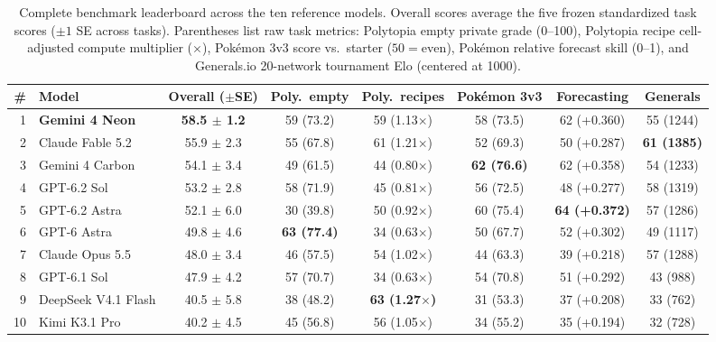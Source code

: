 \documentclass[11pt,letterpaper]{article}
\newcommand{\pokemon}{Pok\'emon}
\begin{document}
\begin{table}[htbp]
\centering
\caption{Complete benchmark leaderboard across the ten reference models. Overall scores average the five frozen standardized task scores ($\pm 1$ SE across tasks). Parentheses list raw task metrics: Polytopia empty private grade (0--100), Polytopia recipe cell-adjusted compute multiplier ($\times$), \pokemon{} 3v3 score vs.\ starter ($50 = \text{even}$), \pokemon{} relative forecast skill (0--1), and Generals.io 20-network tournament Elo (centered at 1000).}
\label{tab:leaderboard}
\footnotesize
\setlength{\tabcolsep}{3.6pt}
\begin{tabular}{@{}r l c ccccc@{}}
\toprule
\textbf{\#} & \textbf{Model} & \textbf{Overall ($\pm$SE)} & \textbf{Poly.\ empty} & \textbf{Poly.\ recipes} & \textbf{\pokemon{} 3v3} & \textbf{Forecasting} & \textbf{Generals} \\
\midrule
1  & \textbf{Gemini 4 Neon}     & \textbf{58.5 $\pm$ 1.2} & 59 (73.2) & 59 (1.13$\times$) & 58 (73.5) & 62 (+0.360) & 55 (1244) \\
2  & Claude Fable 5.2           & 55.9 $\pm$ 2.3 & 55 (67.8) & 61 (1.21$\times$) & 52 (69.3) & 50 (+0.287) & \textbf{61 (1385)} \\
3  & Gemini 4 Carbon            & 54.1 $\pm$ 3.4 & 49 (61.5) & 44 (0.80$\times$) & \textbf{62 (76.6)} & 62 (+0.358) & 54 (1233) \\
4  & GPT-6.2 Sol                & 53.2 $\pm$ 2.8 & 58 (71.9) & 45 (0.81$\times$) & 56 (72.5) & 48 (+0.277) & 58 (1319) \\
5  & GPT-6.2 Astra              & 52.1 $\pm$ 6.0 & 30 (39.8) & 50 (0.92$\times$) & 60 (75.4) & \textbf{64 (+0.372)} & 57 (1286) \\
6  & GPT-6 Astra                & 49.8 $\pm$ 4.6 & \textbf{63 (77.4)} & 34 (0.63$\times$) & 50 (67.7) & 52 (+0.302) & 49 (1117) \\
7  & Claude Opus 5.5            & 48.0 $\pm$ 3.4 & 46 (57.5) & 54 (1.02$\times$) & 44 (63.3) & 39 (+0.218) & 57 (1288) \\
8  & GPT-6.1 Sol                & 47.9 $\pm$ 4.2 & 57 (70.7) & 34 (0.63$\times$) & 54 (70.8) & 51 (+0.292) & 43 (988)  \\
9  & DeepSeek V4.1 Flash        & 40.5 $\pm$ 5.8 & 38 (48.2) & \textbf{63 (1.27$\times$)} & 31 (53.3) & 37 (+0.208) & 33 (762)  \\
10 & Kimi K3.1 Pro              & 40.2 $\pm$ 4.5 & 45 (56.8) & 56 (1.05$\times$) & 34 (55.2) & 35 (+0.194) & 32 (728)  \\
\bottomrule
\end{tabular}
\end{table}
\end{document}
